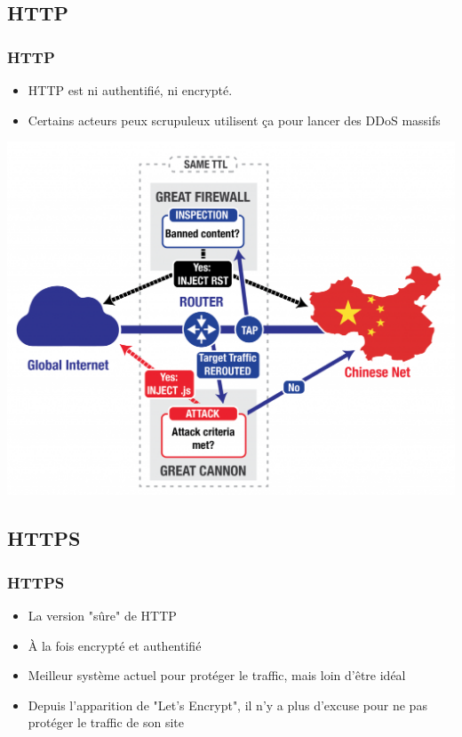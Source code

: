 \subsection{HTTP}
\begin{frame}
\frametitle{HTTP}

\begin{itemize}
    \item HTTP est ni authentifié, ni encrypté.
    \item Certains acteurs peux scrupuleux utilisent ça pour lancer des DDoS massifs
\end{itemize}
\begin{center}
\includegraphics[scale=0.20]{res/great_cannon}
\end{center}
\end{frame}



\subsection{HTTPS}
\begin{frame}
    \frametitle{HTTPS}
    \begin{itemize}
        \item La version "sûre" de HTTP
        \item À la fois encrypté et authentifié
        \item Meilleur système actuel pour protéger le traffic, mais loin d'être idéal 
        \item Depuis l'apparition de "Let's Encrypt", il n'y a plus d'excuse pour ne pas protéger le traffic de son site
    \end{itemize}
\end{frame}

